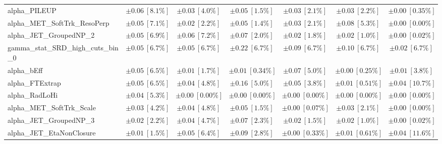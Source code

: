 \begin{sidewaystable}
\begin{center}
\begin{tabular*}{\textwidth}{@{\extracolsep{\fill}}lcccccc}
alpha\_PILEUP         & $\pm 0.06\ [8.1\%] $          & $\pm 0.03\ [4.0\%] $          & $\pm 0.05\ [1.5\%] $          & $\pm 0.03\ [2.1\%] $          & $\pm 0.03\ [2.2\%] $          & $\pm 0.00\ [0.35\%] $       \\
alpha\_MET\_SoftTrk\_ResoPerp         & $\pm 0.05\ [7.1\%] $          & $\pm 0.02\ [2.2\%] $          & $\pm 0.05\ [1.4\%] $          & $\pm 0.03\ [2.1\%] $          & $\pm 0.08\ [5.3\%] $          & $\pm 0.00\ [0.00\%] $       \\
alpha\_JET\_GroupedNP\_2         & $\pm 0.05\ [6.9\%] $          & $\pm 0.06\ [7.2\%] $          & $\pm 0.07\ [2.0\%] $          & $\pm 0.02\ [1.8\%] $          & $\pm 0.02\ [1.0\%] $          & $\pm 0.00\ [0.02\%] $       \\
gamma\_stat\_SRD\_high\_cuts\_bin\_0         & $\pm 0.05\ [6.7\%] $          & $\pm 0.05\ [6.7\%] $          & $\pm 0.22\ [6.7\%] $          & $\pm 0.09\ [6.7\%] $          & $\pm 0.10\ [6.7\%] $          & $\pm 0.02\ [6.7\%] $       \\
alpha\_bEff         & $\pm 0.05\ [6.5\%] $          & $\pm 0.01\ [1.7\%] $          & $\pm 0.01\ [0.34\%] $          & $\pm 0.07\ [5.0\%] $          & $\pm 0.00\ [0.25\%] $          & $\pm 0.01\ [3.8\%] $       \\
alpha\_FTExtrap         & $\pm 0.05\ [6.5\%] $          & $\pm 0.04\ [4.8\%] $          & $\pm 0.16\ [5.0\%] $          & $\pm 0.05\ [3.8\%] $          & $\pm 0.01\ [0.51\%] $          & $\pm 0.04\ [10.7\%] $       \\
alpha\_RadLoHi         & $\pm 0.04\ [5.3\%] $          & $\pm 0.00\ [0.00\%] $          & $\pm 0.00\ [0.00\%] $          & $\pm 0.00\ [0.00\%] $          & $\pm 0.00\ [0.00\%] $          & $\pm 0.00\ [0.00\%] $       \\
alpha\_MET\_SoftTrk\_Scale         & $\pm 0.03\ [4.2\%] $          & $\pm 0.04\ [4.8\%] $          & $\pm 0.05\ [1.5\%] $          & $\pm 0.00\ [0.07\%] $          & $\pm 0.03\ [2.1\%] $          & $\pm 0.00\ [0.00\%] $       \\
alpha\_JET\_GroupedNP\_3         & $\pm 0.02\ [2.2\%] $          & $\pm 0.04\ [4.7\%] $          & $\pm 0.07\ [2.3\%] $          & $\pm 0.02\ [1.5\%] $          & $\pm 0.02\ [1.0\%] $          & $\pm 0.00\ [0.02\%] $       \\
alpha\_JET\_EtaNonClosure         & $\pm 0.01\ [1.5\%] $          & $\pm 0.05\ [6.4\%] $          & $\pm 0.09\ [2.8\%] $          & $\pm 0.00\ [0.33\%] $          & $\pm 0.01\ [0.61\%] $          & $\pm 0.04\ [11.6\%] $       \\

\end{tabular*}
\end{center}
\end{sidewaystable}
